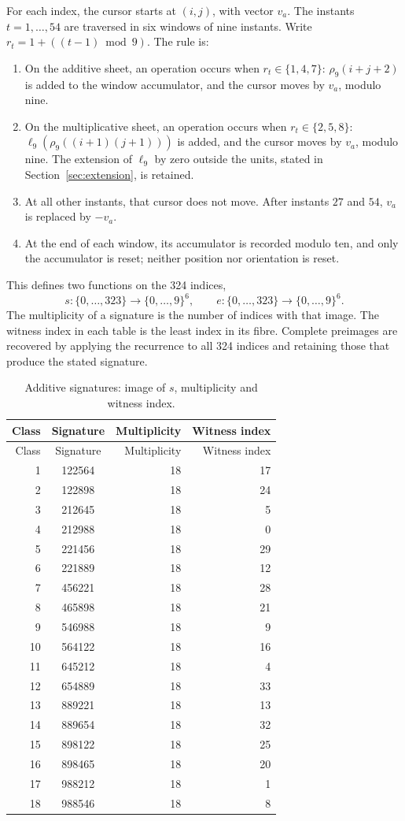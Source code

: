 For each index, the cursor starts at \((i,j)\), with vector \(v_a\).
The instants \(t=1,\ldots,54\) are traversed in six windows
of nine instants. Write \(r_t=1+((t-1)\bmod9)\). The rule is:
\begin{enumerate}
\item On the additive sheet, an operation occurs when \(r_t\in\{1,4,7\}\):
\(\rho_9(i+j+2)\) is added to the window accumulator, and the
cursor moves by \(v_a\), modulo nine.
\item On the multiplicative sheet, an operation occurs when \(r_t\in\{2,5,8\}\):
\(\ell_9(\rho_9((i+1)(j+1)))\) is added, and the cursor moves
by \(v_a\), modulo nine. The extension of \(\ell_9\) by zero
outside the units, stated in Section~\ref{sec:extension}, is retained.
\item At all other instants, that cursor does not move. After
instants \(27\) and \(54\), \(v_a\) is replaced by \(-v_a\).
\item At the end of each window, its accumulator is recorded modulo ten,
and only the accumulator is reset; neither position nor orientation is reset.
\end{enumerate}
This defines two functions on the 324 indices,
\[
 s:\{0,\ldots,323\}\longrightarrow\{0,\ldots,9\}^6,\qquad
 e:\{0,\ldots,323\}\longrightarrow\{0,\ldots,9\}^6.
\]
The multiplicity of a signature is the number of indices with that image.
The witness index in each table is the least index in its fibre.
Complete preimages are recovered by applying the recurrence to all
324 indices and retaining those that produce the stated signature.

\begin{longtable}{rcrr}
\caption{Additive signatures: image of \(s\), multiplicity and witness index.}
\label{iv:tabla-firmas-aditivas}\\
\toprule
Class & Signature & Multiplicity & Witness index\\
\midrule
\endfirsthead
\toprule
Class & Signature & Multiplicity & Witness index\\
\midrule
\endhead
1&122564&18&17\\
2&122898&18&24\\
3&212645&18&5\\
4&212988&18&0\\
5&221456&18&29\\
6&221889&18&12\\
7&456221&18&28\\
8&465898&18&21\\
9&546988&18&9\\
10&564122&18&16\\
11&645212&18&4\\
12&654889&18&33\\
13&889221&18&13\\
14&889654&18&32\\
15&898122&18&25\\
16&898465&18&20\\
17&988212&18&1\\
18&988546&18&8\\
\bottomrule
\end{longtable}

